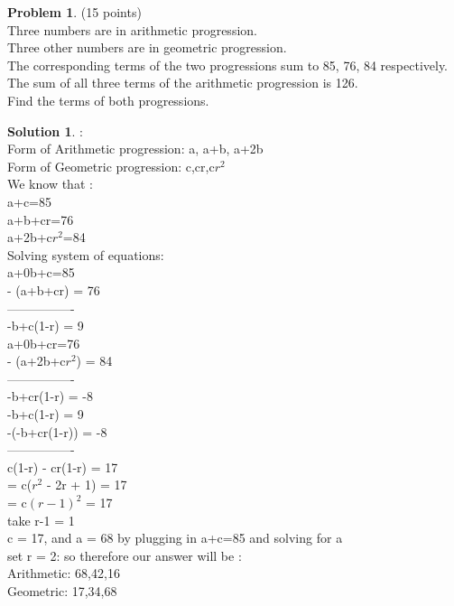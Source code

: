 \documentclass{article}
\theoremstyle{definition}
\newtheorem{problem}{Problem}
\newtheorem*{solution}{Solution}
\begin{document}
\newpage

\begin{problem} (15 points)\\
Three numbers are in arithmetic progression.\\
Three other numbers are in geometric progression.\\
The corresponding terms of the two progressions sum to 85, 76, 84 respectively.\\
The sum of all three terms of the arithmetic progression is 126.\\
Find the terms of both progressions.
\end{problem}
\begin{solution} : \\
Form of Arithmetic progression: a, a+b, a+2b \\
Form of Geometric progression: c,cr,c$r^2$ \\

We know that :
\\
a+c=85 \\
a+b+cr=76 \\
a+2b+c$r^2$=84 \\

Solving system of equations:\\ 
a+0b+c=85 \\ 
- (a+b+cr) = 76 \\
----------------\\
-b+c(1-r) = 9\\

a+0b+cr=76 \\ 
- (a+2b+c$r^2$) = 84 \\
----------------\\
-b+cr(1-r) = -8\\

-b+c(1-r) = 9 \\ 
-(-b+cr(1-r)) = -8 \\
----------------\\
c(1-r) - cr(1-r) = 17 \\ 
= c($r^2$ - 2r + 1) = 17\\
= c$(r-1)^2$ = 17 \\
take r-1 = 1 \\
c = 17, and a = 68 by plugging in a+c=85 and solving for a\\
set r = 2: so therefore our answer will be : \\
Arithmetic: 68,42,16\\
Geometric: 17,34,68
\end{solution}
\end{document}
